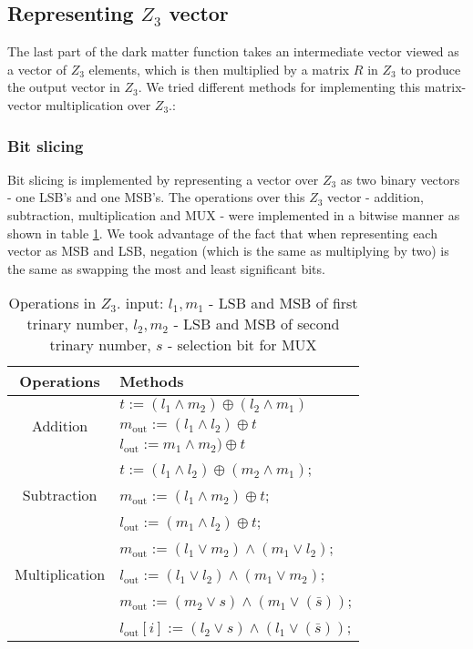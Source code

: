 \subsection{Representing $Z_3$ vector}

The last part of the dark matter function takes an intermediate vector viewed as a vector of $Z_3$ elements, which is then multiplied 
by a matrix $R$ in $Z_3$ to produce the output vector in $Z_3$. We tried different methods for implementing this matrix-vector multiplication over $Z_3$.:	

\subsubsection{Bit slicing} Bit slicing is implemented  by representing a vector over $Z_3$  as two binary vectors - one LSB's and one MSB's. The operations over this $Z_3$ vector - addition, subtraction, multiplication and MUX  - were implemented in a bitwise manner as shown in table \ref{tab:multicol}. We took advantage of the fact that when representing each vector as MSB and LSB, negation (which is the same as multiplying by two) is the same as swapping the most and least significant bits. 





\begin{table}[ht]
	\caption{Operations in $Z_3$. input:   ${l_1}, {m_1}$ - LSB and MSB  of first trinary number, 
		${l_2}, {m_2}$ - LSB and MSB  of second trinary number,  ${s}$ - selection bit for MUX}
	\begin{center}
		\begin{tabular}{|c|l|}
			\hline
			\textbf{Operations} & \textbf{Methods}\\
			\hline
			\multirow{3}{*}{Addition} & ${t} := ({l_1 \wedge m_2}) \oplus ({l_2 \wedge m_1})$\\
			& $m_{\mathrm{out}} := ( l_1 \wedge  l_2 ) \oplus  t $ \\
			& $l_{\mathrm{out}} :=m_1 \wedge m_2 ) \oplus t $ \\
			\hline
			\multirow{3}{*}{Subtraction} & ${t} := ({l_1} \wedge {l_2}) \oplus ({m_2} \wedge {m_1})$;\\
			& $m_{\mathrm{out}} := (l_1 \wedge m_2 ) \oplus t$;\\
			& $l_{\mathrm{out}} := (m_1 \wedge l_2 ) \oplus t$; \\
			\hline
			\multirow{3}{*}{Multiplication} & $m_{\mathrm{out}}:= (l_1 \vee m_2) \wedge   (m_1 \vee l_2)$; \\
			& $l_{\mathrm{out}} := (l_1 \vee l_2) \wedge     (m_1 \vee m_2)$;\\
			\hline
			\multirow{3}{*}{MUX} & $m_{\mathrm{out}} :=( m_2 \vee s) \wedge (m_1 \vee (\bar{s}) )$; \\
			& $l_{\mathrm{out}}[i] :=( l_2 \vee s) \wedge (l_1 \vee (\bar{s}) )$; \\
			\hline
			
		\end{tabular}
	\end{center}
	\label{tab:multicol}
\end{table}


